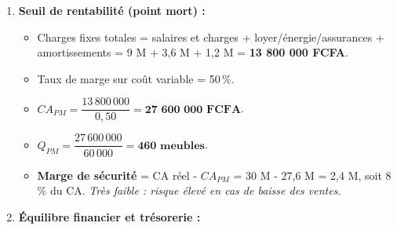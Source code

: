 \documentclass[11pt]{article}
\begin{document}
\begin{exoresolu}
\begin{enumerate}
\begin{align*}
                  \text{Sous-traitance} &= 3\,000\,000 \\
                  \textbf{Marge brute} &= 30\,000\,000 - 15\,000\,000 = \textbf{15\,000\,000} \\
                  \textbf{Taux de marge} &= \frac{15\,000\,000}{30\,000\,000} = \textbf{50\,\%} \\
                  \text{Charges fixes (hors amortissements et intérêts)} &= 9\,000\,000 + 3\,600\,000 = 12\,600\,000 \\
                  \textbf{EBE} &= 15\,000\,000 - 12\,600\,000 = \textbf{2\,400\,000} \\
                  \text{Amortissements} &= 1\,200\,000 \\
                  \text{Résultat d'exploitation} &= 2\,400\,000 - 1\,200\,000 = 1\,200\,000 \\
                  \text{Intérêts} &= 600\,000 \\
                  \text{Résultat courant avant impôt} &= 1\,200\,000 - 600\,000 = 600\,000 \\
                  \text{Impôt (30\,\%)} &= 180\,000 \\
                  \textbf{Résultat net} &= 600\,000 - 180\,000 = \textbf{420\,000} \\
                  \textbf{CAF} &= \text{Résultat net} + \text{Amortissements} = 420\,000 + 1\,200\,000 = \textbf{1\,620\,000}
              \end{align*}
        \item \textbf{Seuil de rentabilité (point mort) :}
              \begin{itemize}
                  \item Charges fixes totales = salaires et charges + loyer/énergie/assurances + amortissements = 9 M + 3,6 M + 1,2 M = \textbf{13 800 000 FCFA}.
                  \item Taux de marge sur coût variable = 50\,\%.
                  \item $CA_{PM} = \dfrac{13\,800\,000}{0,50} = \textbf{27 600 000 FCFA}$.
                  \item $Q_{PM} = \dfrac{27\,600\,000}{60\,000} = \textbf{460 meubles}$.
                  \item \textbf{Marge de sécurité} = CA réel - $CA_{PM}$ = 30 M - 27,6 M = 2,4 M, soit 8\,\% du CA. \emph{Très faible : risque élevé en cas de baisse des ventes.}
              \end{itemize}
        \item \textbf{Équilibre financier et trésorerie :}

\end{enumerate}
\end{exoresolu}
\end{document}
